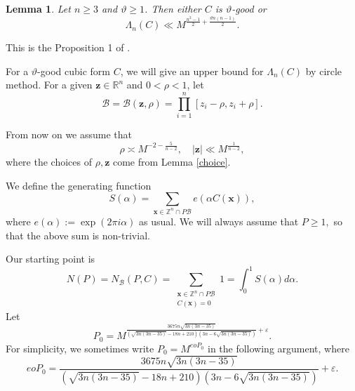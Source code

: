 \documentclass[12pt]{amsart}
\newtheorem{lemma}[theorem]{Lemma}
\theoremstyle{definition}
\numberwithin{equation}{section}
\begin{document}
\begin{lemma}
\label{lemma_when_not_good}
Let $n \geq 3$ and $\vartheta \geq 1$. Then either $C$ is $\vartheta$-good or
\begin{equation}
    \label{when_not_good}
    \Lambda_{n}(C) \ll M^{\frac{n^2-1}{2}+\frac{\vartheta n(n-1)}{2}}.
\end{equation}
\end{lemma}

This is the Proposition 1 of \cite{browning2009least}.

For a $\vartheta$-good cubic form $C$, we will give an upper bound for $\Lambda_{n}(C)$ by circle method. For a given $\boldsymbol{z} \in \mathbb{R}^n$ and $0 < \rho < 1$, let
\begin{equation*}
    \mathscr{B}=\mathscr{B}(\boldsymbol{z},\rho) =\prod_{i=1}^{n}[z_i-\rho,z_i+\rho].
\end{equation*}

From now on we assume that
\begin{equation}
    \label{rho,z}
    \rho \asymp M^{-2-\frac{5}{n-2}},\quad |\boldsymbol {z}| \ll M^{\frac{1}{n-2}},
\end{equation}
where the choices of $\rho, \boldsymbol {z}$ come from Lemma \ref{choice}.


We define the generating function
\begin{equation*}
    S(\alpha) = \sum_{\boldsymbol{x}\in \mathbb{Z}^{n}\cap P\mathscr{B}} e(\alpha C(\boldsymbol{x})),
\end{equation*}
where $e(\alpha) := \exp(2\pi i\alpha)$ as usual. We will always assume that $ P \geq 1,$ so that the above sum is non-trivial.

Our starting point is
 \begin{equation}
    \label{N(P)dingyi}
     N(P)=N_{\mathscr{B}}(P,C)=\sum_{\substack{\boldsymbol {x}\in \mathbb{Z}^{n}\cap P\mathscr{B}\\[3pt]C(\boldsymbol {x})=0}} 1=\int_0^1 S(\alpha) d\alpha. 
 \end{equation}
Let %
\begin{equation} 
    \label{P_0_vartheta_definition}
    P_{0} = M^{\frac{3675n\sqrt{3n(3n-35)}}{(\sqrt{3n(3n-35)}-18n+210)(3n-6\sqrt{3n(3n-35)})}+\varepsilon}.
\end{equation}
For simplicity, we sometimes write $P_0=M^{eoP_0}$ in the following argument, where
\begin{equation}
    \label{eop_definition}
    eoP_0=\frac{3675n\sqrt{3n(3n-35)}}{(\sqrt{3n(3n-35)}-18n+210)(3n-6\sqrt{3n(3n-35)})}+\varepsilon.
\end{equation}
\end{document}
